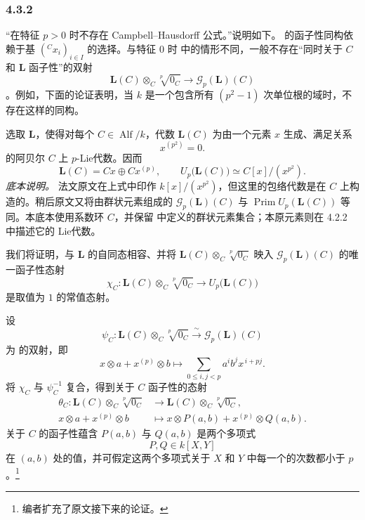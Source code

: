 
\subsubsection*{4.3.2}
\label{sga3:VIIB:4.3.2}

“在特征 \(p>0\) 时不存在 Campbell--Hausdorff 公式。”说明如下。 的函子性同构依赖于基
\(({}^C x_i)_{i\in I}\) 的选择。与特征 \(0\) 时  中的情形不同，一般不存在“同时关于 \(C\) 和 \(\mathbf L\) 函子性”的双射
\[
  \mathbf L(C)\otimes_C\sqrt[p]{0_C}
  \longrightarrow
  \mathscr G_p(\mathbf L)(C)
\]
。例如，下面的论证表明，当 \(k\) 是一个包含所有
\((p^2-1)\) 次单位根的域时，不存在这样的同构。

选取 \(\mathbf L\)，使得对每个
\(C\in\operatorname{Alf}/k\)，代数 \(\mathbf L(C)\) 为由一个元素 \(x\) 生成、满足关系
\[
  x^{(p^2)}=0.
\]
的阿贝尔 \(C\) 上 \(p\)-Lie代数。因而
\[
  \mathbf L(C)
  =
  Cx\oplus Cx^{(p)},
  \qquad
  U_p\bigl(\mathbf L(C)\bigr)
  \simeq
  C[x]/(x^{p^2}).
\]
\label{sga3:VIIB:4.3.2:source-notation-note}
\noindent\textit{底本说明。}\enspace
法文原文在上式中印作 \(k[x]/(x^{p^2})\)，但这里的包络代数是在 \(C\) 上构造的。稍后原文又将由群状元素组成的 \(\mathscr G_p(\mathbf L)(C)\) 与
\(\operatorname{Prim}U_p(\mathbf L(C))\) 等同。本底本使用系数环 \(C\)，并保留  中定义的群状元素集合；本原元素则在 4.2.2 中描述它的 Lie代数。

我们将证明，与 \(\mathbf L\) 的自同态相容、并将
\(\mathbf L(C)\otimes_C\sqrt[p]{0_C}\) 映入
\(\mathscr G_p(\mathbf L)(C)\) 的唯一函子性态射
\[
  \chi_C:
  \mathbf L(C)\otimes_C\sqrt[p]{0_C}
  \longrightarrow
  U_p\bigl(\mathbf L(C)\bigr)
\]
是取值为 \(1\) 的常值态射。

设
\[
  \psi_C:
  \mathbf L(C)\otimes_C\sqrt[p]{0_C}
  \xrightarrow{\ \sim\ }
  \mathscr G_p(\mathbf L)(C)
\]
为  的双射，即
\[
  x\otimes a+x^{(p)}\otimes b
  \longmapsto
  \sum_{0\leq i,j<p}
  a^i b^j x^{\,i+pj}.
\]
将 \(\chi_C\) 与 \(\psi_C^{-1}\) 复合，得到关于 \(C\) 函子性的态射
\[
\begin{aligned}
  \theta_C:
  \mathbf L(C)\otimes_C\sqrt[p]{0_C}
  &\longrightarrow
  \mathbf L(C)\otimes_C\sqrt[p]{0_C},
  \\
  x\otimes a+x^{(p)}\otimes b
  &\longmapsto
  x\otimes P(a,b)+x^{(p)}\otimes Q(a,b).
\end{aligned}
\]
关于 \(C\) 的函子性蕴含 \(P(a,b)\) 与 \(Q(a,b)\) 是两个多项式
\[
  P,Q\in k[X,Y]
\]
在 \((a,b)\) 处的值，并可假定这两个多项式关于 \(X\) 和 \(Y\) 中每一个的次数都小于 \(p\)。\footnote{\label{sga3:VIIB:nde:138}编者扩充了原文接下来的论证。}

